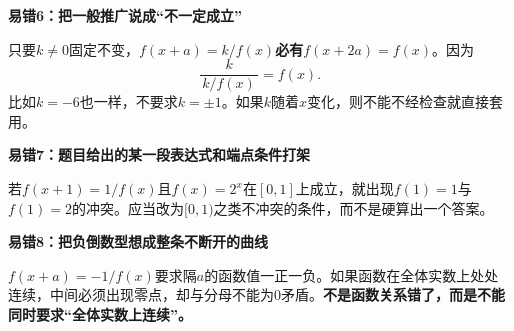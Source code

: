 \clearpage
\begin{trapbox}
\textbf{\textcolor{CTrap}{易错6：把一般推广说成“不一定成立”}}



只要$k\ne0$固定不变，$f(x+a)=k/f(x)$\textbf{必有}$f(x+2a)=f(x)$。因为
\[
 \frac{k}{\,k/f(x)\,}=f(x).
\]
比如$k=-6$也一样，不要求$k=\pm1$。如果$k$随着$x$变化，则不能不经检查就直接套用。



\medskip

\end{trapbox}
\clearpage
\begin{trapbox}
\textbf{\textcolor{CTrap}{易错7：题目给出的某一段表达式和端点条件打架}}



若$f(x+1)=1/f(x)$且$f(x)=2^x$在$[0,1]$上成立，就出现$f(1)=1$与$f(1)=2$的冲突。应当改为$[0,1)$之类不冲突的条件，而不是硬算出一个答案。

\medskip

\end{trapbox}
\clearpage
\begin{trapbox}
\textbf{\textcolor{CTrap}{易错8：把负倒数型想成整条不断开的曲线}}



$f(x+a)=-1/f(x)$要求隔$a$的函数值一正一负。如果函数在全体实数上处处连续，中间必须出现零点，却与分母不能为$0$矛盾。\textbf{不是函数关系错了，而是不能同时要求“全体实数上连续”。}
\end{trapbox}
